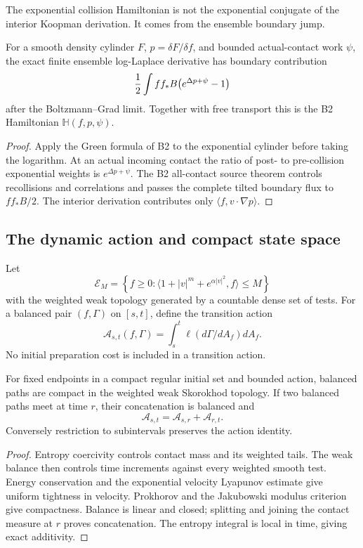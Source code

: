 The exponential collision Hamiltonian is not the exponential conjugate of the
interior Koopman derivation.  It comes from the ensemble boundary jump.

\begin{theorem}
\label{thm:r16-b4-boundary}
For a smooth density cylinder \(F\), \(p=\delta F/\delta f\), and bounded
actual-contact work \(\psi\), the exact finite ensemble log-Laplace derivative
has boundary contribution
\[
 {1\over2}\int ff_*B
 \bigl(e^{\Delta p+\psi}-1\bigr)
\]
after the Boltzmann--Grad limit.  Together with free transport this is the B2
Hamiltonian \(\mathbb H(f,p,\psi)\).
\end{theorem}

\begin{proof}
Apply the Green formula of B2 to the exponential cylinder before taking the
logarithm.  At an actual incoming contact the ratio of post- to pre-collision
exponential weights is \(e^{\Delta p+\psi}\).  The B2 all-contact source
theorem controls recollisions and correlations and passes the complete tilted
boundary flux to \(ff_*B/2\).  The interior derivation contributes only
\(\langle f,v\cdot\nabla p\rangle\).
\end{proof}

\subsection{The dynamic action and compact state space}

Let
\[
 \mathcal E_M=
 \left\{f\ge0:\langle1+|v|^m+e^{\alpha|v|^2},f\rangle\le M\right\}
\]
with the weighted weak topology generated by a countable dense set of tests.
For a balanced pair \((f,\Gamma)\) on \([s,t]\), define the transition action
\[
 \mathcal A_{s,t}(f,\Gamma)
 =\int_s^t\ell(d\Gamma/dA_f)dA_f.
\]
No initial preparation cost is included in a transition action.

\begin{lemma}
\label{lem:r16-b4-compact}
For fixed endpoints in a compact regular initial set and bounded action,
balanced paths are compact in the weighted weak Skorokhod topology.  If two
balanced paths meet at time \(r\), their concatenation is balanced and
\[
 \mathcal A_{s,t}=\mathcal A_{s,r}+\mathcal A_{r,t}.
\]
Conversely restriction to subintervals preserves the action identity.
\end{lemma}

\begin{proof}
Entropy coercivity controls contact mass and its weighted tails.  The weak
balance then controls time increments against every weighted smooth test.
Energy conservation and the exponential velocity Lyapunov estimate give
uniform tightness in velocity.  Prokhorov and the Jakubowski modulus criterion
give compactness.  Balance is linear and closed; splitting and joining the
contact measure at \(r\) proves concatenation.  The entropy integral is local
in time, giving exact additivity.
\end{proof}

